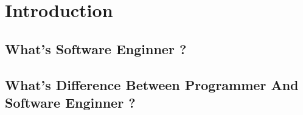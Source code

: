 \section{Introduction}
\subsection{What's Software Enginner ?}

\subsection{What's Difference Between Programmer And Software Enginner ?}

